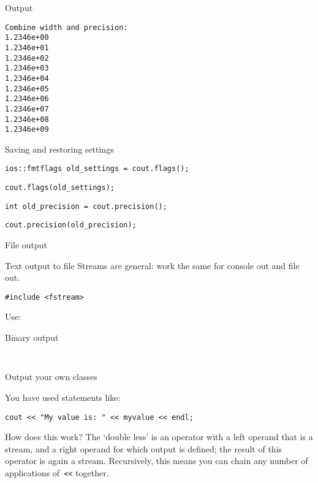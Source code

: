 \begin{block}{Output}
  \label{sl:io-sci-out}
\begin{verbatim}
Combine width and precision:
1.2346e+00
1.2346e+01
1.2346e+02
1.2346e+03
1.2346e+04
1.2346e+05
1.2346e+06
1.2346e+07
1.2346e+08
1.2346e+09
\end{verbatim}
\end{block}

 {Saving and restoring settings}

\begin{verbatim}
ios::fmtflags old_settings = cout.flags();
\end{verbatim}

\begin{verbatim}
cout.flags(old_settings);
\end{verbatim}

\begin{verbatim}
int old_precision = cout.precision();
\end{verbatim}

\begin{verbatim}
cout.precision(old_precision);
\end{verbatim}

 {File output}

\begin{block}{Text output to file}
  \label{sl:io-file}
Streams are general: work the same for console out and file out.
\begin{verbatim}
#include <fstream>
\end{verbatim}
Use:
\end{block}

\begin{block}{Binary output}
  \label{sl:io-bin}
\begin{verbatim}
  
\end{verbatim}
\end{block}

 {Output your own classes}
\label{sec:lessless}

You have used statements like:
\begin{verbatim}
cout << "My value is: " << myvalue << endl;
\end{verbatim}
How does this work? The `double less' is an operator with a left
operand that is a stream, and a right operand for which output is
defined; the result of this operator is again a stream. Recursively,
this means you can chain any number of applications of~\verb+<<+
together.

